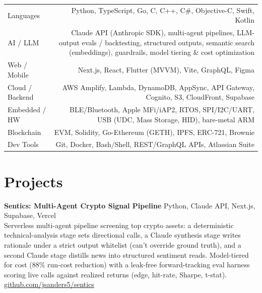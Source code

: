 \documentclass[10.5pt, letterpaper]{article}
\begin{document}
\begin{tabularx}{\linewidth}{@{}LR@{}}
  Languages          & Python, TypeScript, Go, C, C++, C\#,
                       Objective-C, Swift, Kotlin \\[3pt]
  AI / LLM           & Claude API (Anthropic SDK), multi-agent pipelines, LLM-output
                       evals / backtesting, structured outputs, semantic search
                       (embeddings), guardrails, model tiering \& cost optimization \\[3pt]
  Web / Mobile       & Next.js, React, Flutter (MVVM), Vite, GraphQL, Figma \\[3pt]
  Cloud / Backend    & AWS Amplify, Lambda, DynamoDB, AppSync, API Gateway,
                       Cognito, S3, CloudFront, Supabase \\[3pt]
  Embedded / HW      & BLE/Bluetooth, Apple MFi/iAP2, RTOS, SPI/I2C/UART,
                       USB (UDC, Mass Storage, HID), bare-metal ARM \\[3pt]
  Blockchain         & EVM, Solidity, Go-Ethereum (GETH), IPFS, ERC-721, Brownie \\[3pt]
  Dev Tools          & Git, Docker, Bash/Shell, REST/GraphQL APIs, Atlassian Suite \\[3pt]
\end{tabularx}

\section{Projects}

\noindent\textbf{Sentics: Multi-Agent Crypto Signal Pipeline}
\hfill\textcolor{muted}{\small Python, Claude API, Next.js, Supabase, Vercel}\\
Serverless multi-agent pipeline screening top crypto assets: a deterministic
technical-analysis stage sets directional calls, a Claude synthesis stage writes
rationale under a strict output whitelist (can't override ground truth), and a
second Claude stage distills news into structured sentiment reads. Model-tiered
for cost (88\% run-cost reduction) with a leak-free forward-tracking eval harness
scoring live calls against realized returns (edge, hit-rate, Sharpe, t-stat).
\hfill\textcolor{muted}{\small\href{https://github.com/jsanders5/sentics}{github.com/jsanders5/sentics}}

\vspace{5pt}
\end{document}
